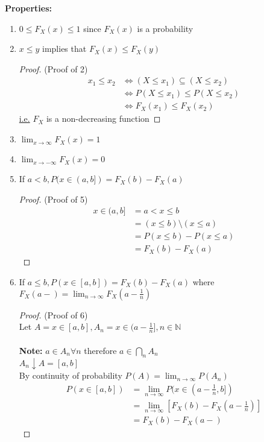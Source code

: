 \documentclass[12pt, twoside]{article}
\begin{document}
\textbf{Properties:}
\begin{enumerate}
	\item{$0 \leq F_X (x) \leq 1$ since $F_X (x)$ is a probability}
	\item{$x \leq y$ implies that $F_X (x) \leq F_X (y)$\\
	\begin{proof}(Proof of 2)\\
	\begin{align*}
		x_1 \leq x_2 & \Longleftrightarrow (X \leq x_1) \subseteq (X \leq x_2)\\
		& \Longleftrightarrow P(X \leq x_1) \leq P(X \leq x_2)\\
		& \Longleftrightarrow F_X (x_1) \leq F_X (x_2)
	\end{align*}
	\underline{i.e.} $F_X$ is a non-decreasing function
\end{proof}}
	\item{$\lim_{x\to\infty} F_X (x) = 1$}
	\item{$\lim_{x\to -\infty} F_X (x) = 0$}
	\item{If $a < b, P(x \in (a,b]) = F_X (b) - F_X (a)$\\
	\begin{proof}
		(Proof of 5)\\
		\begin{align*}
			x \in (a,b] &= a < x \leq b\\
			&= (x \leq b) \setminus (x \leq a)\\
			&= P(x \leq b) - P(x \leq a)\\
			&= F_X (b) - F_X (a)
		\end{align*}

	\end{proof}
}
	\item{
	If $a \leq b, P(x \in [a,b]) = F_X (b) - F_X (a)$ where $F_X (a-) = \lim_{n\to\infty} F_X (a-\frac{1}{n}) $\\
	\begin{proof} (Proof of 6)\\
		Let $A = x \in [a,b], A_n = x \in (a - \frac{1}{n}], n \in \mathbb{N}$\\
		\\
		\textbf{Note:} $a \in A_n \forall n$ therefore $a \in \bigcap\limits_{n} A_n $\\
		$A_n \downarrow A = [a,b]$\\
		By continuity of probability $P(A) = \lim_{n\to\infty} P(A_n)$
		\begin{align*}
			P(x\in [a,b]) &= \lim_{n\to\infty} P(x\in (a-\frac{1}{n}, b])\\
			&= \lim_{n\to\infty} [F_X (b) - F_X (a-\frac{1}{n})]\\
			&= F_X (b) - F_X (a-)
		\end{align*}
	\end{proof}

}
\end{enumerate}
\end{document}
